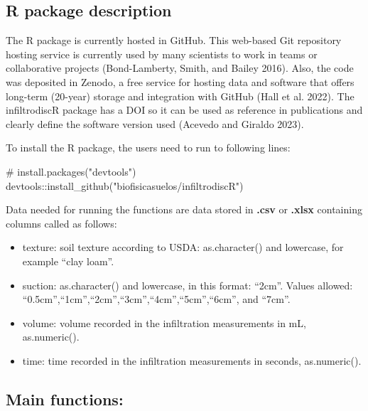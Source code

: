 \documentclass[
]{article}
\newenvironment{Shaded}{\begin{snugshade}}{\end{snugshade}}
\newcommand{\CommentTok}[1]{\textcolor[rgb]{0.37,0.37,0.37}{#1}}
\newcommand{\FunctionTok}[1]{\textcolor[rgb]{0.28,0.35,0.67}{#1}}
\newcommand{\NormalTok}[1]{\textcolor[rgb]{0.00,0.23,0.31}{#1}}
\newcommand{\SpecialCharTok}[1]{\textcolor[rgb]{0.37,0.37,0.37}{#1}}
\newcommand{\StringTok}[1]{\textcolor[rgb]{0.13,0.47,0.30}{#1}}
\providecommand{\tightlist}{%
  \setlength{\itemsep}{0pt}\setlength{\parskip}{0pt}}\usepackage{longtable,booktabs,array}
\begin{document}
\hypertarget{r-package-description}{%
\subsection{R package description}\label{r-package-description}}

The R package is currently hosted in GitHub. This web-based Git
repository hosting service is currently used by many scientists to work
in teams or collaborative projects (Bond-Lamberty, Smith, and Bailey
2016). Also, the code was deposited in Zenodo, a free service for
hosting data and software that offers long-term (20-year) storage and
integration with GitHub (Hall et al. 2022). The infiltrodiscR package
has a DOI so it can be used as reference in publications and clearly
define the software version used (Acevedo and Giraldo 2023).

To install the R package, the users need to run to following lines:

\begin{Shaded}
\begin{Highlighting}[]
\CommentTok{\# install.packages("devtools")}
\NormalTok{devtools}\SpecialCharTok{::}\FunctionTok{install\_github}\NormalTok{(}\StringTok{"biofisicasuelos/infiltrodiscR"}\NormalTok{)}
\end{Highlighting}
\end{Shaded}

Data needed for running the functions are data stored in \textbf{.csv}
or \textbf{.xlsx} containing columns called as follows:

\begin{itemize}
\tightlist
\item
  texture: soil texture according to USDA: as.character() and lowercase,
  for example ``clay loam''.
\item
  suction: as.character() and lowercase, in this format: ``2cm''. Values
  allowed: ``0.5cm'',``1cm'',``2cm'',``3cm'',``4cm'',``5cm'',``6cm'',
  and ``7cm''.
\item
  volume: volume recorded in the infiltration measurements in mL,
  as.numeric().
\item
  time: time recorded in the infiltration measurements in seconds,
  as.numeric().
\end{itemize}

\hypertarget{main-functions}{%
\subsection{Main functions:}\label{main-functions}}
\end{document}

